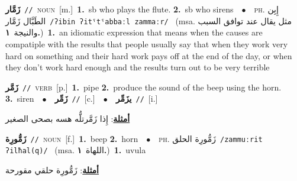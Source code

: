 \documentclass[10pt,a4paper,twoside]{article} %
\begin{document}
\begin{multicols}{2}
{\setlength\topsep{0pt}\textbf{\foreignlanguage{arabic}{زَمَّار}}\ {\color{gray}\texttt{//}\color{black}}\ \textsc{noun}\ [m.]\ \textbf{1.}~sb who plays the flute.  \textbf{2.}~sb who sirens\ \ $\bullet$\ \ \textsc{ph.} \color{gray} \foreignlanguage{arabic}{إِبِن الطَبَّال زَمَّار}\color{black}\ {\color{gray}\texttt{/{\sffamily ʔibin ʔitˤtˤabbaːl zammaːr}/}\color{black}}\ \color{gray} (msa. \foreignlanguage{arabic}{مثل يقال عند توافق السبب والنيجة}~\foreignlanguage{arabic}{\textbf{١.}})\color{black}\ \textbf{1.}~an idiomatic expression that means  when the causes are compatiple with the results that people usually say that when they work very hard on something and their hard work pays off at the end of the day, or when they don't work hard enough and the results turn out to be very terrible\ } \vspace{2mm}

{\setlength\topsep{0pt}\textbf{\foreignlanguage{arabic}{زَمَّر}}\ {\color{gray}\texttt{//}\color{black}}\ \textsc{verb}\ [p.]\ \textbf{1.}~pipe  \textbf{2.}~produce the sound of the beep using the horn.  \textbf{3.}~siren\ \ $\bullet$\ \ \setlength\topsep{0pt}\textbf{\foreignlanguage{arabic}{زَمِّر}}\ {\color{gray}\texttt{//}\color{black}}\ [c.]\ \ $\bullet$\ \ \setlength\topsep{0pt}\textbf{\foreignlanguage{arabic}{يزَمِّر}}\ {\color{gray}\texttt{//}\color{black}}\ [i.]\  \begin{flushright}\color{gray}\foreignlanguage{arabic}{\textbf{\underline{\foreignlanguage{arabic}{أمثلة}}}: إِذا زَمَّرتلُّه هسه بصحى الصغير}\end{flushright}\color{black}} \vspace{2mm}

{\setlength\topsep{0pt}\textbf{\foreignlanguage{arabic}{زَمُّورِة}}\ {\color{gray}\texttt{//}\color{black}}\ \textsc{noun}\ [f.]\ \textbf{1.}~beep  \textbf{2.}~horn\ \ $\bullet$\ \ \textsc{ph.} \color{gray} \foreignlanguage{arabic}{زَمُّورِة الحلق}\color{black}\ {\color{gray}\texttt{/{\sffamily zammuːrit ʔilħal(q)}/}\color{black}}\ \color{gray} (msa. \foreignlanguage{arabic}{اللهاة}~\foreignlanguage{arabic}{\textbf{١.}})\color{black}\ \textbf{1.}~uvula\  \begin{flushright}\color{gray}\foreignlanguage{arabic}{\textbf{\underline{\foreignlanguage{arabic}{أمثلة}}}: زَمُّورِة حلقي مقورحة}\end{flushright}\color{black}} \vspace{2mm}


\end{multicols}
\end{document}
